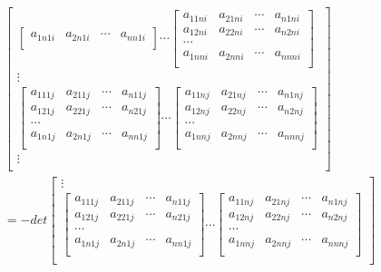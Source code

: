 \documentclass[twoside,a4paper,CCT]{cctart}   %
\begin{document}
\begin{list}{}
\begin{align*}
\begin{bmatrix}
\begin{bmatrix}
a_{1n1i}& a_{2n1i}&\cdots&a_{nn1i}\\
\end{bmatrix}
\cdots
\begin{bmatrix}
  a_{11ni}& a_{21ni}&\cdots&a_{n1ni}\\
  a_{12ni}& a_{22ni}&\cdots&a_{n2ni}\\
 \cdots\\
 a_{1nni}& a_{2nni}&\cdots&a_{nnni}\\
 \end{bmatrix}\\
\vdots\\
\begin{bmatrix}
  a_{111j}& a_{211j}&\cdots&a_{n11j}\\
  a_{121j}& a_{221j}&\cdots&a_{n21j}\\
   \cdots\\
   a_{1n1j}& a_{2n1j}&\cdots&a_{nn1j}\\
   \end{bmatrix}
\cdots
\begin{bmatrix}
  a_{11nj}& a_{21nj}&\cdots&a_{n1nj}\\
  a_{12nj}& a_{22nj}&\cdots&a_{n2nj}\\
   \cdots\\
   a_{1nnj }& a_{2nnj}&\cdots&a_{nnnj}\\
   \end{bmatrix}\\
\vdots\\
    \end{bmatrix}\\
=-det
  \begin{bmatrix}
\vdots\\
 \begin{bmatrix}
   a_{111j}& a_{211j}&\cdots&a_{n11j}\\
   a_{121j}& a_{221j}&\cdots&a_{n21j}\\
    \cdots\\
   a_{1n1j}& a_{2n1j}&\cdots&a_{nn1j}\\
   \end{bmatrix}
\cdots
\begin{bmatrix}
  a_{11nj}& a_{21nj}&\cdots&a_{n1nj}\\
  a_{12nj}& a_{22nj}&\cdots&a_{n2nj}\\
  \cdots\\
  a_{1nnj }& a_{2nnj}&\cdots&a_{nnnj}\\
  \end{bmatrix}\\

\end{bmatrix}
\end{align*}
\end{list}
\end{document}
